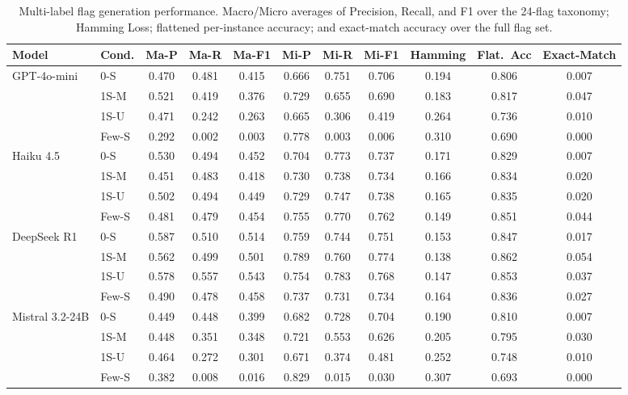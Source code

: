 \begin{table}[t]
\centering
\caption{Multi-label flag generation performance. Macro/Micro averages
of Precision, Recall, and F1 over the 24-flag taxonomy; Hamming Loss;
flattened per-instance accuracy; and exact-match accuracy over the full
flag set.}
\label{tab:multilabel}
\small
\setlength{\tabcolsep}{4pt}
\begin{tabular}{llccccccccc}
\toprule
Model & Cond. & Ma-P & Ma-R & Ma-F1 & Mi-P & Mi-R & Mi-F1 & Hamming & Flat.\ Acc & Exact-Match \\
\midrule
GPT-4o-mini & 0-S & 0.470 & 0.481 & 0.415 & 0.666 & 0.751 & 0.706 & 0.194 & 0.806 & 0.007 \\
 & 1S-M & 0.521 & 0.419 & 0.376 & 0.729 & 0.655 & 0.690 & 0.183 & 0.817 & 0.047 \\
 & 1S-U & 0.471 & 0.242 & 0.263 & 0.665 & 0.306 & 0.419 & 0.264 & 0.736 & 0.010 \\
 & Few-S & 0.292 & 0.002 & 0.003 & 0.778 & 0.003 & 0.006 & 0.310 & 0.690 & 0.000 \\
Haiku 4.5 & 0-S & 0.530 & 0.494 & 0.452 & 0.704 & 0.773 & 0.737 & 0.171 & 0.829 & 0.007 \\
 & 1S-M & 0.451 & 0.483 & 0.418 & 0.730 & 0.738 & 0.734 & 0.166 & 0.834 & 0.020 \\
 & 1S-U & 0.502 & 0.494 & 0.449 & 0.729 & 0.747 & 0.738 & 0.165 & 0.835 & 0.020 \\
 & Few-S & 0.481 & 0.479 & 0.454 & 0.755 & 0.770 & 0.762 & 0.149 & 0.851 & 0.044 \\
DeepSeek R1 & 0-S & 0.587 & 0.510 & 0.514 & 0.759 & 0.744 & 0.751 & 0.153 & 0.847 & 0.017 \\
 & 1S-M & 0.562 & 0.499 & 0.501 & 0.789 & 0.760 & 0.774 & 0.138 & 0.862 & 0.054 \\
 & 1S-U & 0.578 & 0.557 & 0.543 & 0.754 & 0.783 & 0.768 & 0.147 & 0.853 & 0.037 \\
 & Few-S & 0.490 & 0.478 & 0.458 & 0.737 & 0.731 & 0.734 & 0.164 & 0.836 & 0.027 \\
Mistral 3.2-24B & 0-S & 0.449 & 0.448 & 0.399 & 0.682 & 0.728 & 0.704 & 0.190 & 0.810 & 0.007 \\
 & 1S-M & 0.448 & 0.351 & 0.348 & 0.721 & 0.553 & 0.626 & 0.205 & 0.795 & 0.030 \\
 & 1S-U & 0.464 & 0.272 & 0.301 & 0.671 & 0.374 & 0.481 & 0.252 & 0.748 & 0.010 \\
 & Few-S & 0.382 & 0.008 & 0.016 & 0.829 & 0.015 & 0.030 & 0.307 & 0.693 & 0.000 \\
\bottomrule
\end{tabular}
\end{table}
